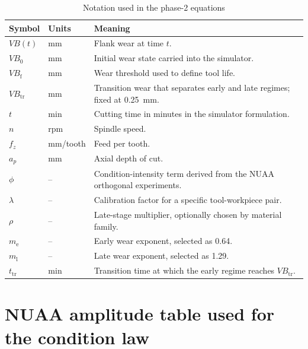 \documentclass[11pt,a4paper]{article}
\newcommand{\vb}{V\!B}
\newcommand{\vbf}{V\!B_{\mathrm{f}}}
\newcommand{\vbtr}{V\!B_{\mathrm{tr}}}
\newcommand{\ttr}{t_{\mathrm{tr}}}
\newcommand{\phii}{\phi}
\newcommand{\earlyexp}{m_{\mathrm{e}}}
\newcommand{\lateexp}{m_{\mathrm{l}}}
\begin{document}
\begin{table}[H]
\centering
\caption{Notation used in the phase-2 equations}
\begin{tabularx}{\textwidth}{>{\raggedright\arraybackslash}p{2.0cm}>{\raggedright\arraybackslash}p{2.1cm}X}
\toprule
Symbol & Units & Meaning \\
\midrule
\(\vb(t)\) & mm & Flank wear at time \(t\). \\
\(\vb_0\) & mm & Initial wear state carried into the simulator. \\
\(\vbf\) & mm & Wear threshold used to define tool life. \\
\(\vbtr\) & mm & Transition wear that separates early and late regimes; fixed at \SI{0.25}{mm}. \\
\(t\) & min & Cutting time in minutes in the simulator formulation. \\
\(n\) & rpm & Spindle speed. \\
\(f_z\) & mm/tooth & Feed per tooth. \\
\(a_p\) & mm & Axial depth of cut. \\
\(\phii\) & -- & Condition-intensity term derived from the NUAA orthogonal experiments. \\
\(\lambda\) & -- & Calibration factor for a specific tool-workpiece pair. \\
\(\rho\) & -- & Late-stage multiplier, optionally chosen by material family. \\
\(\earlyexp\) & -- & Early wear exponent, selected as \num{0.64}. \\
\(\lateexp\) & -- & Late wear exponent, selected as \num{1.29}. \\
\(\ttr\) & min & Transition time at which the early regime reaches \(\vbtr\). \\
\bottomrule
\end{tabularx}
\end{table}

\section{NUAA amplitude table used for the condition law}
\end{document}
